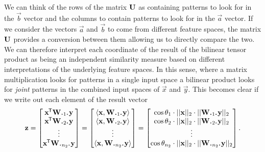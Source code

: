 We can think of the rows of the matrix \(\mathbf{U}\) 
as containing patterns to look for in the \(\vec{b}\) vector and the columns to
contain patterns to look for in the \(\vec{a}\) vector. If we consider the vectors 
\(\vec{a}\) and \(\vec{b}\) to come from different feature spaces, the matrix \(\mathbf{U}\)
provides a conversion between them allowing us to directly compare the two. We can therefore
interpret each coordinate of the result of the bilinear tensor product as being an
independent similarity measure based on different interpretations of the underlying
feature spaces. In this sense, where a matrix multiplication looks for patterns in a single input
space a bilinear product looks for \emph{joint} patterns in the combined input spaces of
\(\vec{x}\) and \(\vec{y}\). This becomes clear if we write out each element of the result
vector
\begin{equation} \label{eq:features}
	\vec{z} = \begin{bmatrix}
		\tran{\vec{x}}\mat{W}_{\midbullet 1 \midbullet}\vec{y} \\
		\tran{\vec{x}}\mat{W}_{\midbullet 2 \midbullet}\vec{y} \\
		\vdots \\
		\tran{\vec{x}}\mat{W}_{\midbullet n_2 \midbullet}\vec{y}
	\end{bmatrix}
	= \begin{bmatrix}
		\langle\vec{x}, \mat{W}_{\midbullet 1 \midbullet} \vec{y}\rangle \\
		\langle\vec{x}, \mat{W}_{\midbullet 2 \midbullet} \vec{y}\rangle \\
		\vdots \\
		\langle\vec{x}, \mat{W}_{\midbullet n_2 \midbullet} \vec{y}\rangle
	\end{bmatrix}
	 = \begin{bmatrix}
	 	\cos \theta_1 \cdot ||\vec{x}||_2 \cdot ||\mat{W}_{\midbullet 1 \midbullet}\vec{y}||_2 \\
	 	\cos \theta_2 \cdot ||\vec{x}||_2 \cdot ||\mat{W}_{\midbullet 2 \midbullet}\vec{y}||_2 \\
		\vdots \\
	 	\cos \theta_{n_2} \cdot ||\vec{x}||_2 \cdot ||\mat{W}_{\midbullet n_2 \midbullet}\vec{y}||_2 \\
	 \end{bmatrix}.
\end{equation}



